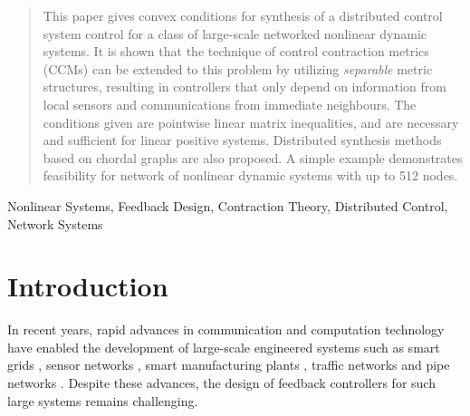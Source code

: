 \documentclass[10pt,twocolumn,twoside]{IEEEtran}
\newcounter{para}
\newcommand\mypara{\par}
\theoremstyle{plain}
\theoremstyle{definition}
\theoremstyle{remark}
\begin{document}
\maketitle

\begin{abstract}
This paper gives convex conditions for synthesis of a distributed  control system control for a class of large-scale networked nonlinear dynamic systems.  It is shown that the technique of control contraction metrics (CCMs) can be extended to this problem by utilizing {\em separable} metric structures, resulting in controllers that only depend on information from local sensors and communications from immediate neighbours. The conditions given are pointwise linear matrix inequalities, and are necessary and sufficient for linear positive systems. Distributed synthesis methods based on chordal graphs are also proposed. A simple example demonstrates feasibility for network  of nonlinear dynamic systems with up to 512 nodes.
\end{abstract}

\begin{IEEEkeywords}
Nonlinear Systems, Feedback Design, Contraction Theory, Distributed Control, Network Systems
\end{IEEEkeywords}






%
\IEEEpeerreviewmaketitle



\section{Introduction}

\mypara In recent years, rapid advances in communication and  computation technology have enabled the development of large-scale engineered systems such as smart grids \cite{hill_smart_2012}, sensor networks \cite{Pajic2011}, smart manufacturing plants \cite{wang_implementing_2016}, traffic networks \cite{CanudasdeWitMorbidiLeonOjedaEtAl2015} and pipe networks \cite{Persis2011a}. Despite these advances, the design of feedback controllers for such large systems remains challenging.
\end{document}
